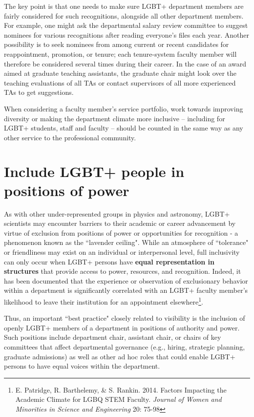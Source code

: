 The key point is that one needs to make sure LGBT+ department members are fairly considered for such recognitions, alongside all other department members. For example, one might ask the departmental salary review committee to suggest nominees for various recognitions after reading everyone's files each year. Another possibility is to seek nominees from among current or recent candidates for reappointment, promotion, or tenure; each tenure-system faculty member will therefore be considered several times during their career. In the case of an award aimed at graduate teaching assistants, the graduate chair might look over the teaching evaluations of all TAs or contact supervisors of all more experienced TAs to get suggestions.

When considering a faculty member's service portfolio, work towards improving diversity or making the department climate more inclusive -- including for LGBT+ students, staff and faculty -- should be counted in the same way as any other service to the professional community.


\section {Include LGBT+ people in positions of power}
\label{positions-of-power}
As with other under-represented groups in physics and astronomy, LGBT+ scientists may encounter barriers to their academic or career advancement by virtue of exclusion from positions of power or opportunities for recognition - a phenomenon known as the ``lavender ceiling". While an atmosphere of ``tolerance" or friendliness may exist on an individual or interpersonal level, full inclusivity can only occur when LGBT+ persons have \textbf{equal representation in structures} that provide access to power, resources, and recognition. Indeed, it has been documented that the experience or observation of exclusionary behavior within a department is significantly correlated with an LGBT+ faculty member's likelihood to leave their institution for an appointment elsewhere\footnote{E. Patridge, R. Barthelemy, \& S. Rankin. 2014. Factors Impacting the Academic Climate for LGBQ STEM Faculty. {\em Journal of Women and Minorities in Science and Engineering}\/ 20: 75-98}.

Thus, an important ``best practice" closely related to visibility is the inclusion of openly LGBT+ members of a department in positions of authority and power. Such positions include department chair, assistant chair, or chairs of key committees that affect departmental governance (e.g., hiring, strategic planning, graduate admissions) as well as other ad hoc roles that could enable LGBT+ persons to have equal voices within the department.


